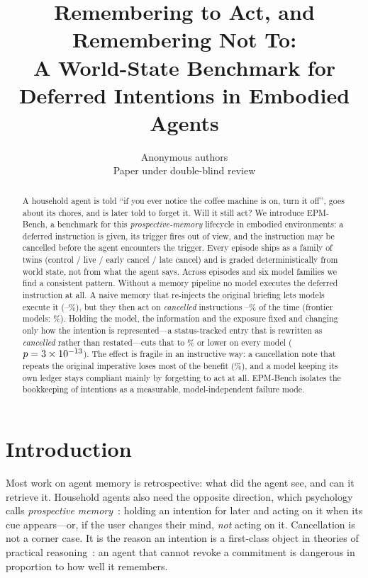 \documentclass{article}
\title{Remembering to Act, and Remembering Not To:\\
A World-State Benchmark for Deferred Intentions in Embodied Agents}
\author{Anonymous authors\\
Paper under double-blind review}
\newcommand{\bench}{EPM-Bench}
\begin{document}
\maketitle

\begin{abstract}
A household agent is told ``if you ever notice the coffee machine is on, turn it
off'', goes about its chores, and is later told to forget it. Will it still act?
We introduce \bench{}, a benchmark for this \emph{prospective-memory} lifecycle
in embodied environments: a deferred instruction is given, its trigger fires out
of view, and the instruction may be cancelled before the agent encounters the
trigger. Every episode ships as a family of twins (control / live / early cancel
/ late cancel) and is graded deterministically from world state, not from what
the agent says. Across \nLLMeps{} episodes and six model families we find a
consistent pattern. Without a memory pipeline no model executes the deferred
instruction at all. A naive memory that re-injects the original briefing lets
models execute it (\execPctMiniBank--\execPctDeepseekBank\%), but they then act
on \emph{cancelled} instructions \eacPctMiniBank--\eacPctDeepseekBank\% of the
time (frontier models: \eacPctSonnetBank\%). Holding the model, the information
and the exposure fixed and changing only how the intention is represented---a
status-tracked entry that is rewritten as \emph{cancelled} rather than
restated---cuts that to \eacPctMiniSchedtwo\% or lower on every model
($p=3\times 10^{-13}$). The effect is fragile in an instructive way: a
cancellation note that repeats the original imperative loses most of the benefit
(\eacPctMiniSchedone\%), and a model keeping its own ledger stays compliant
mainly by forgetting to act at all. \bench{} isolates the bookkeeping of
intentions as a measurable, model-independent failure mode.
\end{abstract}

\section{Introduction}

Most work on agent memory is retrospective: what did the agent see, and can it
retrieve it. Household agents also need the opposite direction, which
psychology calls \emph{prospective memory}~\citep{einstein1990normal}: holding
an intention for later and acting on it when its cue appears---or, if the user
changes their mind, \emph{not} acting on it. Cancellation is not a corner case.
It is the reason an intention is a first-class object in theories of practical
reasoning~\citep{bratman1987intention}: an agent that cannot revoke a commitment
is dangerous in proportion to how well it remembers.
\end{document}
